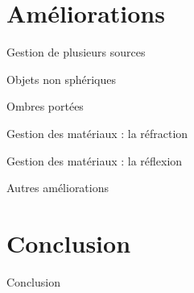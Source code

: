 \documentclass{beamer}
\begin{document}
\section{Améliorations}
\begin{frame}{Gestion de plusieurs sources}

\end{frame}

\begin{frame}{Objets non sphériques}
\end{frame}

\begin{frame}{Ombres portées}
\end{frame}

\begin{frame}{Gestion des matériaux : la réfraction}
\end{frame}

\begin{frame}{Gestion des matériaux : la réflexion}
\end{frame}

\begin{frame}{Autres améliorations}
\end{frame}

\section{Conclusion}
\begin{frame}{Conclusion}
\end{frame}
\end{document}
